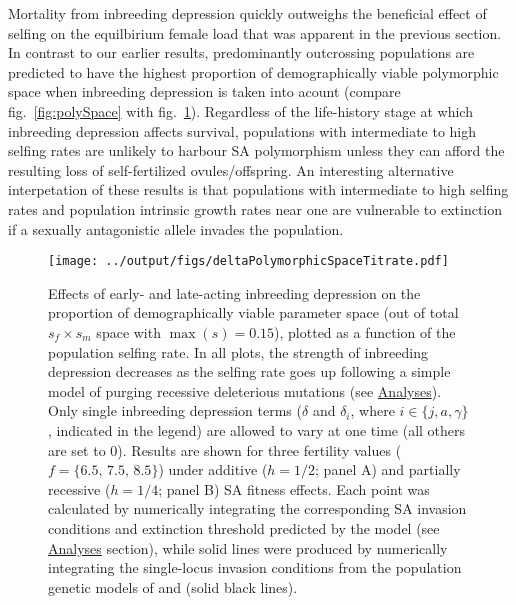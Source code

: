 \documentclass[11pt]{article}
\begin{document}
Mortality from inbreeding depression quickly outweighs the beneficial effect of selfing on the equilbirium female load that was apparent in the previous section. In contrast to our earlier results, predominantly outcrossing populations are predicted to have the highest proportion of demographically viable polymorphic space when inbreeding depression is taken into acount (compare fig.~\ref{fig:polySpace} with fig.~\ref{fig:deltaPolySpace}). Regardless of the life-history stage at which inbreeding depression affects survival, populations with intermediate to high selfing rates are unlikely to harbour SA polymorphism unless they can afford the resulting loss of self-fertilized ovules/offspring. An interesting alternative interpetation of these results is that populations with intermediate to high selfing rates and population intrinsic growth rates near one are vulnerable to extinction if a sexually antagonistic allele invades the population.


 \begin{figure}[htbp]
 \centering
 \texttt{[image: ../output/figs/deltaPolymorphicSpaceTitrate.pdf]}
 \caption{\footnotesize{Effects of early- and late-acting inbreeding depression on the proportion of demographically viable parameter space (out of total $s_f \times s_m$ space with $\max(s) = 0.15$), plotted as a function of the population selfing rate. In all plots, the strength of inbreeding depression decreases as the selfing rate goes up following a simple model of purging recessive deleterious mutations (see \hyperref[subsec:analyses]{Analyses}). Only single inbreeding depression terms ($\delta$ and $\delta_i$, where $i \in \{j,a,\gamma\}$, indicated in the legend) are allowed to vary at one time (all others are set to $0$). Results are shown for three fertility values ($f = \{6.5,\,7.5,\,8.5\}$) under additive ($h = 1/2$; panel A) and partially recessive ($h = 1/4$; panel B) SA fitness effects. Each point was calculated by numerically integrating the corresponding SA invasion conditions and extinction threshold predicted by the model (see \hyperref[subsec:analyses]{Analyses} section), while solid lines were produced by numerically integrating the single-locus invasion conditions from the population genetic models of \citet{JordanConnallon2014} and \citet{Olito2017} (solid black lines).}} 
 \label{fig:deltaPolySpace}
 \end{figure}
\end{document}
